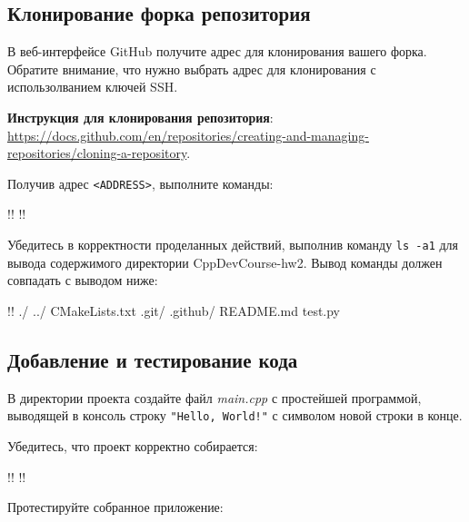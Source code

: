 \documentclass[14pt]{extarticle}
\begin{document}
    \subsection{Клонирование форка репозитория}

    В веб-интерфейсе GitHub получите адрес для клонирования вашего форка.
    Обратите внимание, что нужно выбрать адрес для клонирования с использолванием
    ключей SSH.

    \begin{tcolorbox}
        \textbf{Инструкция для клонирования репозитория}: \\
        \url{https://docs.github.com/en/repositories/creating-and-managing-repositories/cloning-a-repository}.
    \end{tcolorbox}

    Получив адрес \verb|<ADDRESS>|, выполните команды:

    \begin{terminalwindow}
!!
!!
    \end{terminalwindow}

    Убедитесь в корректности проделанных действий, выполнив команду \verb|ls -a1|
    для вывода содержимого директории CppDevCourse-hw2.
    Вывод команды должен совпадать с выводом ниже:

    \begin{terminalwindow}
!!
./
../
CMakeLists.txt
.git/
.github/
README.md
test.py
    \end{terminalwindow}

    \subsection{Добавление и тестирование кода}

    В директории проекта создайте файл \textit{main.cpp} с простейшей программой,
    выводящей в консоль строку \verb|"Hello, World!"| с символом новой строки в конце.

    Убедитесь, что проект корректно собирается:

    \begin{terminalwindow}
!!
!!
    \end{terminalwindow}

    Протестируйте собранное приложение:

\end{document}

